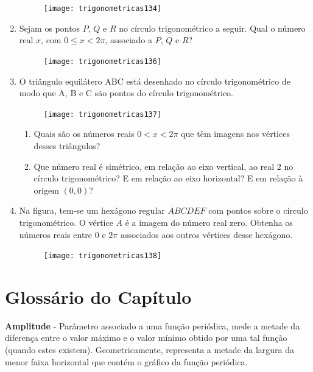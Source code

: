 \begin{enumerate}
\begin{figure}[H]
\centering

\texttt{[image: trigonometricas134]}
\end{figure}

\item Sejam os pontos $P$, $Q$ e $R$ no círculo trigonométrico a seguir. Qual o número real $x$, com $0\leq x<2\pi$, associado a $P$, $Q$ e $R$?
\begin{figure}[H]
\centering

\texttt{[image: trigonometricas136]}
\end{figure}


\item O triângulo equilátero ABC está desenhado no círculo trigonométrico de modo que A, B e C são pontos do círculo trigonométrico.

\begin{figure}[H]
\centering

\texttt{[image: trigonometricas137]}
\end{figure}

\begin{enumerate}
\item Quais são os números reais $0<x<2\pi$ que têm imagens nos vértices desses triângulos?
\item Que número real é simétrico, em relação ao eixo vertical, ao real $2$ no círculo trigonométrico? E em relação ao eixo horizontal? E em relação à origem $(0,0)$?
\end{enumerate}


\item Na figura, tem-se um hexágono regular $ABCDEF$ com pontos sobre o círculo trigonométrico. O vértice $A$ é a imagem do número real zero. Obtenha os números reais entre $0$ e $2\pi$ associados aos outros vértices desse hexágono.

\begin{figure}[H]
\centering

\texttt{[image: trigonometricas138]}
\end{figure}
\end{enumerate}



\clearpage

\section{Glossário do Capítulo}

\textbf{Amplitude} - Parâmetro associado a uma função periódica, mede a metade da diferença entre o valor máximo e o valor mínimo obtido por uma tal função (quando estes existem). Geometricamente, representa a metade da largura da menor faixa horizontal que contém o gráfico da função periódica.

